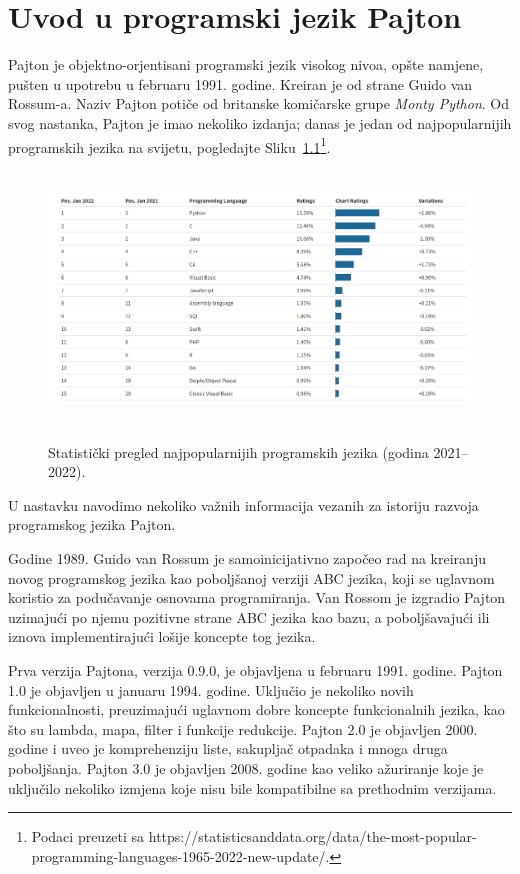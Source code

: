 \chapter{Uvod u programski jezik Pajton} 
 

Pajton je objektno-orjentisani programski jezik visokog nivoa,  opšte   namjene,   pušten u upotrebu u februaru 1991. godine. Kreiran je od strane Guido van Rossum-a. Naziv Pajton potiče od britanske komičarske grupe \textit{Monty Python}. Od svog nastanka, Pajton je imao nekoliko  izdanja; danas je jedan od najpopularnijih programskih jezika na svijetu, pogledajte Sliku~\ref{fig: popular_program_lang}\footnote{Podaci preuzeti sa https://statisticsanddata.org/data/the-most-popular-programming-languages-1965-2022-new-update/.}.

\begin{figure}[H]
	\centering
	\includegraphics[width=400pt,height=190pt]{slike/most_popular_language.png}
	\label{fig: popular_program_lang}
	\caption{Statistički pregled najpopularnijih programskih jezika (godina 2021--2022). }
\end{figure}

U nastavku navodimo nekoliko važnih informacija vezanih za istoriju razvoja programskog jezika Pajton. 
 
Godine 1989. Guido van Rossum je samoinicijativno započeo rad na kreiranju novog programskog jezika kao poboljšanoj verziji ABC jezika, koji se uglavnom koristio za podučavanje osnovama  programiranja. Van Rossom je izgradio Pajton uzimajući po njemu pozitivne strane ABC jezika kao bazu, a poboljšavajući ili iznova implementirajući lošije koncepte tog jezika. 

 Prva verzija Pajtona, verzija 0.9.0, je objavljena  u februaru 1991. godine.
Pajton 1.0 je objavljen u januaru 1994. godine.  Uključio je nekoliko novih funkcionalnosti, preuzimajući uglavnom dobre koncepte funkcionalnih jezika, kao što su lambda, mapa, filter i funkcije redukcije.
Pajton 2.0 je objavljen 2000. godine i uveo je komprehenziju liste, sakupljač otpadaka i mnoga druga poboljšanja.
Pajton 3.0 je objavljen 2008. godine kao veliko ažuriranje koje je uključilo nekoliko izmjena koje nisu bile kompatibilne sa prethodnim verzijama. \\ 

